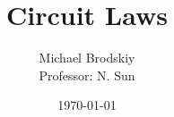 


\title{Circuit Laws}
\date{\today}
\author{Michael Brodskiy\\ \small Professor: N. Sun}



\maketitle

